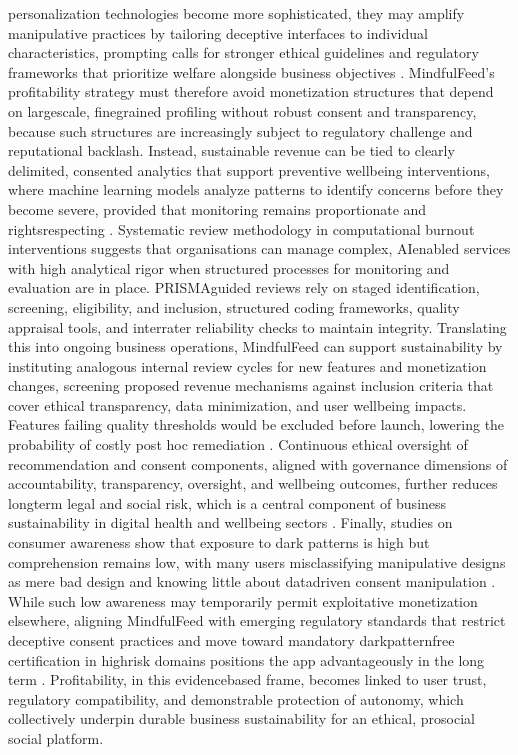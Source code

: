 \documentclass{article}
\begin{document}
personalization technologies become more sophisticated, they may amplify manipulative practices by tailoring deceptive interfaces to individual characteristics, prompting calls for stronger ethical guidelines and regulatory frameworks that prioritize welfare alongside business objectives \parencites[3]{2668071}[7]{9300898}. MindfulFeed's profitability strategy must therefore avoid monetization structures that depend on large\-scale, fine\-grained profiling without robust consent and transparency, because such structures are increasingly subject to regulatory challenge and reputational backlash. Instead, sustainable revenue can be tied to clearly delimited, consented analytics that support preventive well\-being interventions, where machine learning models analyze patterns to identify concerns before they become severe, provided that monitoring remains proportionate and rights\-respecting \parencites[7]{9300898}. Systematic review methodology in computational burnout interventions suggests that organisations can manage complex, AI\-enabled services with high analytical rigor when structured processes for monitoring and evaluation are in place. PRISMA\-guided reviews rely on staged identification, screening, eligibility, and inclusion, structured coding frameworks, quality appraisal tools, and inter\-rater reliability checks to maintain integrity. Translating this into ongoing business operations, MindfulFeed can support sustainability by instituting analogous internal review cycles for new features and monetization changes, screening proposed revenue mechanisms against inclusion criteria that cover ethical transparency, data minimization, and user well\-being impacts. Features failing quality thresholds would be excluded before launch, lowering the probability of costly post hoc remediation \parencites[19]{8760542}. Continuous ethical oversight of recommendation and consent components, aligned with governance dimensions of accountability, transparency, oversight, and well\-being outcomes, further reduces long\-term legal and social risk, which is a central component of business sustainability in digital health and well\-being sectors \parencites[8]{7808872}[7]{9300898}. Finally, studies on consumer awareness show that exposure to dark patterns is high but comprehension remains low, with many users misclassifying manipulative designs as mere bad design and knowing little about data\-driven consent manipulation \parencites[2]{5127387}. While such low awareness may temporarily permit exploitative monetization elsewhere, aligning MindfulFeed with emerging regulatory standards that restrict deceptive consent practices and move toward mandatory dark\-pattern\-free certification in high\-risk domains positions the app advantageously in the long term \parencites[4]{5678011}[8]{4807303}. Profitability, in this evidence\-based frame, becomes linked to user trust, regulatory compatibility, and demonstrable protection of autonomy, which collectively underpin durable business sustainability for an ethical, pro\-social social platform.
\end{document}
